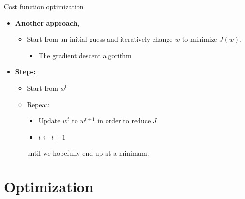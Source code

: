 \documentclass[serif, aspectratio=169]{beamer}
\begin{document}
\begin{frame}{Cost function optimization}

\begin{itemize}
    \item \textbf{Another approach,}
    \begin{itemize}
        \item Start from an initial guess and iteratively change \( w \) to minimize \( J(w) \).
        \begin{itemize}
            \item The gradient descent algorithm
        \end{itemize}
    \end{itemize}
    
    \item \textbf{Steps:}
    \begin{itemize}
        \item Start from \( w^0 \)
        \item Repeat:
        \begin{itemize}
            \item Update \( w^t \) to \( w^{t+1} \) in order to reduce \( J \)
            \item \( t \leftarrow t + 1 \)
        \end{itemize}
        until we hopefully end up at a minimum.
    \end{itemize}
\end{itemize}

\end{frame}

\section{Optimization}
\end{document}
